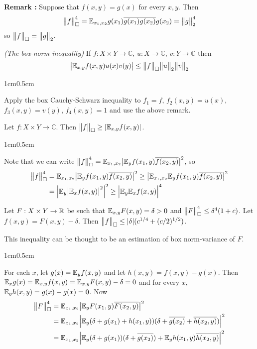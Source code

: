 \documentclass[12pt,a4paper]{report}
\newenvironment{proof}
{\begin{changemargin}{1cm}{0.5cm}
	}%
	{\end{changemargin}
}
\begin{document}
\textbf{Remark :} Suppose that $f(x,y) = g(x)$ for every $x,y$. Then
\begin{align*}
\bigl\lVert f\bigr\rVert_{\tiny{\square}}^4 = \mathbb{E}_{x_1,x_2} g(x_1) \overline{g(x_1)} \overline{g(x_2)} g(x_2) = \bigl\lVert g\bigr\rVert_{2}^4
\end{align*}
so $\bigl\lVert f\bigr\rVert_{\tiny{\square}} = \bigl\lVert g\bigr\rVert_{2}$.
\s

 \emph{(The box-norm inequality)} If $f: X \times Y \rightarrow \mathbb{C}$, $u:X\rightarrow \mathbb{C}$, $v:Y\rightarrow \mathbb{C}$ then
\begin{align*}
\big| \mathbb{E}_{x,y} f(x,y) u(x) v(y) \big| \leq \bigl\lVert f\bigr\rVert_{\tiny{\square}} \bigl\lVert u\bigr\rVert_{2} \bigl\lVert v\bigr\rVert_{2}
\end{align*}
\begin{proof}
\pf Apply the box Cauchy-Schwarz inequality to $f_1=f$, $f_2(x,y) = u(x)$, $f_3(x,y) =v(y)$, $f_4(x,y)=1$ and use the above remark.

\eop
\end{proof}
\s

 Let $f: X\times Y \rightarrow \mathbb{C}$. Then $\bigl\lVert f\bigr\rVert_{\tiny{\square}} \geq |\mathbb{E}_{x,y} f(x,y)|$.
\begin{proof}
\pf Note that we can write $\bigl\lVert f\bigr\rVert_{\tiny{\square}}^4 = \mathbb{E}_{x_1,x_2}  \big| \mathbb{E}_y f(x_1,y) \overline{f(x_2,y)} \big| ^2$, so
\begin{align*}
\bigl\lVert f\bigr\rVert_{\tiny{\square}}^4 &= \mathbb{E}_{x_1,x_2}  \big| \mathbb{E}_y f(x_1,y) \overline{f(x_2,y)} \big| ^2 \geq \big| \mathbb{E}_{x_1,x_2} \mathbb{E}_y f(x_1,y) \overline{f(x_2,y)} \big|^2 \\
&= \Big| \mathbb{E}_y \big| \mathbb{E}_x f(x,y) \big|^2 \Big|^2 \geq \Big| \mathbb{E}_y \mathbb{E}_x f(x,y)   \Big|^4
\end{align*}

\eop
\end{proof}
\s

 Let $F: X\times Y \rightarrow \mathbb{R}$ be such that $\mathbb{E}_{x,y} F(x,y) = \delta >0$ and $\bigl\lVert F\bigr\rVert_{\tiny{\square}}^4 \leq \delta^4 (1+c)$. Let $f(x,y) = F(x,y) - \delta$. Then $\bigl\lVert f\bigr\rVert_{\tiny{\square}} \leq |\delta| (c^{1/4} + (c/2)^{1/2})$.
\s

\quad This inequality can be thought to be an estimation of box norm-variance of $F$.
\begin{proof}
\pf For each $x$, let $g(x) = \mathbb{E}_{y} f(x,y)$ and let $h(x,y)= f(x,y) - g(x)$. Then $\mathbb{E}_x g(x) = \mathbb{E}_{x,y} f(x,y) = \mathbb{E}_{x,y} F(x,y) - \delta =0$ and for every $x$, $\mathbb{E}_{y} h(x,y) = g(x) - g(x) = 0$. Now 
\begin{align*}
\bigl\lVert F\bigr\rVert_{\tiny{\square}}^4 &= \mathbb{E}_{x_1,x_2}  \big| \mathbb{E}_y F(x_1,y) \overline{F(x_2,y)} \big| ^2 \\
&= \mathbb{E}_{x_1,x_2} \Big| \mathbb{E}_y (\delta + g(x_1) + h(x_1,y))(\delta + \overline{g(x_2)} + \overline{h(x_2,y)})\Big|^2 \\
&= \mathbb{E}_{x_1,x_2} \Big| \mathbb{E}_y (\delta + g(x_1))(\delta + \overline{g(x_2)}) + \mathbb{E}_y h(x_1,y) \overline{h(x_2,y)} \Big|^2 \\
\end{align*}
\end{proof}
\s
\end{document}
